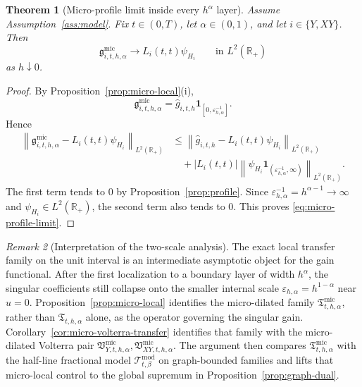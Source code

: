 \documentclass[11pt,a4paper]{amsart}
\theoremstyle{plain}
\newtheorem{theorem}{Theorem}[section]
\theoremstyle{definition}
\theoremstyle{remark}
\newtheorem{remark}[theorem]{Remark}
\newcommand{\R}{\mathbb{R}}
\newcommand{\one}{\mathbf 1}
\begin{document}
\begin{theorem}[Micro-profile limit inside every \(h^\alpha\) layer]
\label{thm:micro-profile}
Assume Assumption~\ref{ass:model}. Fix \(t\in(0,T)\), let \(\alpha\in(0,1)\), and let
\(i\in\{Y,XY\}\). Then
\begin{equation}\label{eq:micro-profile-limit}
\mathfrak g_{i,t,h,\alpha}^{\mathrm{mic}}
\longrightarrow
L_i(t,t)\psi_{H_i}
\qquad\text{in }L^2(\R_+)
\end{equation}
as \(h\downarrow0\).
\end{theorem}

\begin{proof}
By Proposition~\ref{prop:micro-local}(i),
\[
\mathfrak g_{i,t,h,\alpha}^{\mathrm{mic}}
=
\widehat g_{i,t,h}\one_{[0,\varepsilon_{h,\alpha}^{-1}]}.
\]
Hence
\begin{align*}
\left\|
\mathfrak g_{i,t,h,\alpha}^{\mathrm{mic}}-L_i(t,t)\psi_{H_i}
\right\|_{L^2(\R_+)}
&\le
\left\|
\widehat g_{i,t,h}-L_i(t,t)\psi_{H_i}
\right\|_{L^2(\R_+)} \\
&\quad+
|L_i(t,t)|
\left\|
\psi_{H_i}\one_{(\varepsilon_{h,\alpha}^{-1},\infty)}
\right\|_{L^2(\R_+)}.
\end{align*}
The first term tends to \(0\) by Proposition~\ref{prop:profile}. Since
\(\varepsilon_{h,\alpha}^{-1}=h^{\alpha-1}\to\infty\) and \(\psi_{H_i}\in L^2(\R_+)\), the second
term also tends to \(0\). This proves \eqref{eq:micro-profile-limit}.
\end{proof}

\begin{remark}[Interpretation of the two-scale analysis]
The exact local transfer family on the unit interval is an intermediate asymptotic object for the
gain functional.  After the first localization to a boundary layer of width \(h^\alpha\), the
singular coefficients still collapse onto the smaller internal scale
\(\varepsilon_{h,\alpha}=h^{1-\alpha}\) near \(u=0\).  Proposition~\ref{prop:micro-local} identifies the
micro-dilated family \(\mathfrak T_{t,h,\alpha}^{\mathrm{mic}}\), rather than
\(\mathfrak T_{t,h,\alpha}\) alone, as the operator governing the singular gain.
Corollary~\ref{cor:micro-volterra-transfer} identifies that family with the micro-dilated
Volterra pair \(\mathfrak V_{Y,t,h,\alpha}^{\mathrm{mic}},
\mathfrak V_{XY,t,h,\alpha}^{\mathrm{mic}}\).  The argument then compares
\(\mathfrak T_{t,h,\alpha}^{\mathrm{mic}}\) with the half-line fractional model
\(\mathcal T_{t,\beta}^{\mathrm{mod}}\) on graph-bounded families and lifts that micro-local
control to the global supremum in Proposition~\ref{prop:graph-dual}.
\end{remark}
\end{document}
